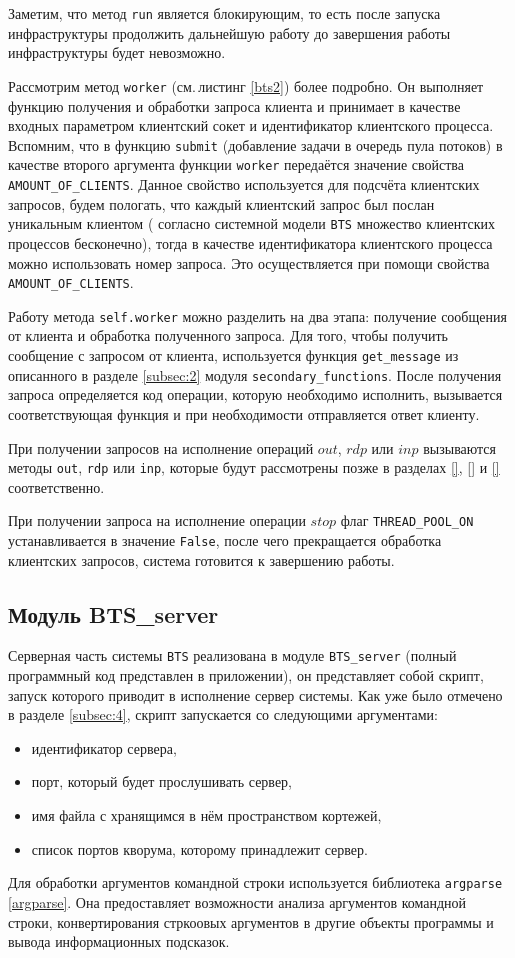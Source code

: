 Заметим, что метод \texttt{run} является блокирующим, то есть после запуска инфраструктуры продолжить дальнейшую работу до завершения работы инфраструктуры будет невозможно.

Рассмотрим метод \texttt{worker} (см.\,листинг \ref{bts2}) более подробно. Он выполняет функцию получения и обработки запроса клиента и принимает в качестве входных параметром клиентский сокет и идентификатор клиентского процесса. Вспомним, что в функцию \texttt{submit} (добавление задачи в очередь пула потоков) в качестве второго аргумента функции \texttt{worker} передаётся значение свойства \texttt{AMOUNT_OF_CLIENTS}. Данное свойство используется для подсчёта клиентских запросов, будем пологать, что каждый клиентский запрос был послан уникальным клиентом ( согласно системной модели \texttt{BTS} множество клиентских процессов бесконечно), тогда в качестве идентификатора клиентского процесса можно использовать номер запроса. Это осуществляется при помощи свойства \texttt{AMOUNT_OF_CLIENTS}.

Работу метода \texttt{self.worker} можно разделить на два этапа: получение сообщения от клиента и обработка полученного запроса. Для того, чтобы получить сообщение с запросом от клиента, используется функция \texttt{get_message} из описанного в разделе \ref{subsec:2} модуля \texttt{secondary\_functions}. После получения запроса определяется код операции, которую необходимо исполнить, вызывается соответствующая функция и при необходимости отправляется ответ клиенту.

При получении запросов на исполнение операций $out$, $rdp$ или $inp$ вызываются методы \texttt{out}, \texttt{rdp} или \texttt{inp}, которые будут рассмотрены позже в разделах \ref{}, \ref{} и \ref{} соответственно.

При получении запроса на исполнение операции $stop$ флаг \texttt{THREAD_POOL_ON} устанавливается в значение \texttt{False}, после чего прекращается обработка клиентских запросов, система готовится к завершению работы.


\subsection{Модуль BTS_server}\label{subsec:5}
Серверная часть системы \texttt{BTS} реализована в модуле \texttt{BTS_server} (полный программный код представлен в приложении), он представляет собой скрипт, запуск которого приводит в исполнение сервер системы. Как уже было отмечено в разделе \ref{subsec:4}, скрипт запускается со следующими аргументами:
\begin{itemize}
	\item идентификатор сервера,
	\item порт, который будет прослушивать сервер,
	\item имя файла с хранящимся в нём пространством кортежей,
	\item список портов кворума, которому принадлежит сервер.
\end{itemize}
Для обработки аргументов командной строки используется библиотека \texttt{argparse} \ref{argparse}. Она предоставляет возможности анализа аргументов командной строки, конвертирования стркоовых аргументов в другие объекты программы и вывода информационных подсказок.

